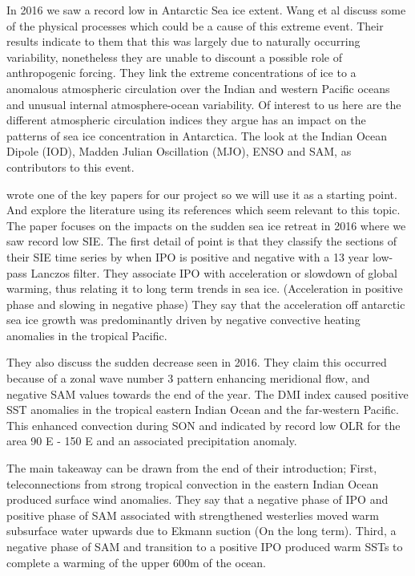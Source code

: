 \documentclass[../main.tex]{subfiles}
\begin{document}
In 2016 we saw a record low in Antarctic Sea ice extent. Wang et al \cite{Wang2019} discuss some of the physical processes which could be a cause of this extreme event. Their results indicate to them that this was largely due to naturally occurring variability, nonetheless they are unable to discount a possible role of anthropogenic forcing. They link the extreme concentrations of ice to a anomalous atmospheric circulation over the Indian and western Pacific oceans and unusual internal atmosphere-ocean variability. Of interest to us here are the different atmospheric circulation indices they argue has an impact on the patterns of sea ice concentration in Antarctica. The look at the Indian Ocean Dipole (IOD), Madden Julian Oscillation (MJO), ENSO and SAM, as contributors to this event.


\cite{Meehl2019} wrote one of the key papers for our project so we will use it as a starting point. And explore the literature using its references which seem relevant to this topic. The paper focuses on the impacts on the sudden sea ice retreat in 2016 where we saw record low SIE. The first detail of point is that they classify the sections of their SIE time series by when IPO is positive and negative with a 13 year low-pass Lanczos filter. They associate IPO with acceleration or slowdown of global warming, thus relating it to long term trends in sea ice. (Acceleration in positive phase and slowing in negative phase) They say that the acceleration off antarctic sea ice growth was predominantly driven by negative convective heating anomalies in the tropical Pacific.

They also discuss the sudden decrease seen in 2016. They claim this occurred because of a zonal wave number 3 pattern enhancing meridional flow, and negative SAM values towards the end of the year. The DMI index caused positive SST anomalies in the tropical eastern Indian Ocean and the far-western Pacific. This enhanced convection during SON and indicated by record low OLR for the area 90 E - 150 E and an associated precipitation anomaly.

The main takeaway can be drawn from the end of their introduction; First, teleconnections from strong tropical convection in the eastern Indian Ocean produced surface wind anomalies.
They say that a negative phase of IPO and positive phase of SAM associated with strengthened westerlies moved warm subsurface water upwards due to Ekmann suction (On the long term). Third, a negative phase of SAM and transition to a positive IPO produced warm SSTs to complete a warming of the upper 600m of the ocean.
\medskip
\end{document}
